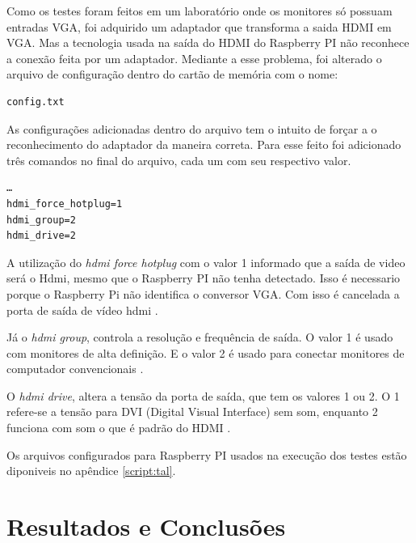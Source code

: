 \documentclass[
	12pt,				%
	openright,			%
	twoside,			%
	a4paper,			%
	chapter=TITLE,		%
	english,			%
	brazil				%
	]{abntex2}
\begin{document}
Como os testes foram feitos em um laboratório onde os monitores só possuam entradas VGA, foi adquirido um adaptador que transforma a saida HDMI em VGA. Mas a tecnologia usada na saída do HDMI do Raspberry PI não reconhece a conexão feita por um adaptador. Mediante a esse problema, foi alterado o arquivo de configuração dentro do cartão de memória com o nome:
\begin{verbatim}
config.txt
\end{verbatim}
As configurações adicionadas dentro do arquivo tem o intuito de forçar a o reconhecimento do adaptador da maneira correta. Para esse feito foi adicionado três comandos no final do arquivo, cada um com seu respectivo valor. 
\begin{verbatim}
…
hdmi_force_hotplug=1
hdmi_group=2
hdmi_drive=2
\end{verbatim}
A utilização do \textit{hdmi force hotplug} com o valor 1 informado que a saída de video será o Hdmi, mesmo que o Raspberry PI não tenha detectado. Isso é necessario porque o Raspberry Pi não identifica o conversor VGA. Com isso é cancelada a porta de saída de vídeo hdmi \cite{vga}.  

Já o \textit{hdmi group}, controla a resolução e frequência de saída. O valor 1 é usado com monitores de alta definição. E o valor 2 é usado para  conectar monitores de computador convencionais \cite{vga}. 

O \textit{hdmi drive}, altera a tensão da porta de saída, que tem os valores 1 ou 2. O 1 refere-se a tensão para DVI (Digital Visual Interface) sem som, enquanto 2 funciona com som o que é padrão do HDMI \cite{vga}. 

Os arquivos configurados para Raspberry PI usados na execução dos testes estão diponiveis no apêndice \ref{script:tal}.





\part{Resultados e Conclusões}
\end{document}
